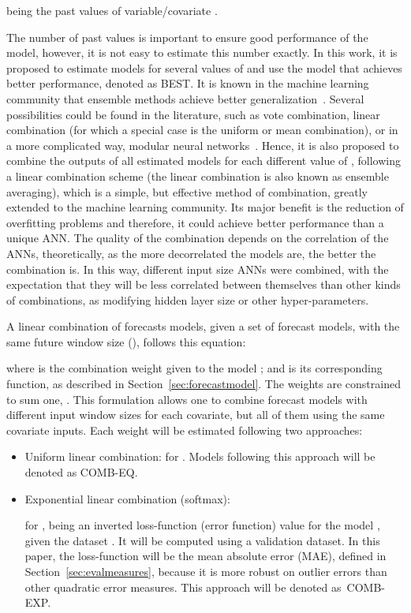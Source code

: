 \documentclass[energies,article,accept,moreauthors,pdftex,12pt,a4paper]{mdpi}
\newcommand{\ann}{ANN\xspace}
\newcommand{\anns}{ANNs\xspace}
\newcommand{\best}{BEST\xspace}
\newcommand{\comb}{COMB-EXP\xspace}
\newcommand{\combeq}{COMB-EQ\xspace}
\begin{document}
\vspace {-9pt}


 being the  past values of
variable/covariate .



The number of past values  is important to ensure good performance of the
model, however, it is not easy to estimate this number exactly. In this work, it
is proposed to estimate models for several values of  and use the model
that achieves better performance, denoted as \best. It is known in the machine learning community that ensemble methods achieve better
generalization~\cite{1991:neuralcomputing:jacobs,2006:icaisc:raudys,Yu20082623}.
Several possibilities could be found in the literature, such as vote combination,
linear combination (for which a special case is the uniform or mean combination),
or in a more complicated way, modular neural networks~\cite{1994:nn:Happel}.
Hence, it is also proposed to combine the outputs of all estimated models for each different
value of , following a linear combination scheme (the linear combination is also known as ensemble averaging),
which is a simple, but effective method of combination, greatly extended to the machine
learning community. Its major benefit is the reduction of overfitting problems
and therefore, it could achieve better performance than a unique \ann.
The quality of the combination depends on the correlation of the \anns,
theoretically, as the more decorrelated the models are, the better the
combination is. In this way, different input size
 \anns were combined, with the expectation that they will be less correlated between themselves than other kinds of combinations, as modifying hidden layer size or other hyper-parameters.

A linear combination of forecasts models, given a set  of  forecast models, \linebreak with the same future window size (), follows this equation:

\vspace {-6pt}


where  is the combination weight given to the model
; and  is its corresponding  function, as
described in Section~\ref{sec:forecastmodel}. The weights are constrained to sum
one, . This formulation allows one to combine forecast
models with different input window sizes for each covariate, but all of them
using the same covariate inputs. Each weight  will be estimated
following two approaches:

\begin{itemize}
\item Uniform linear combination:  for . Models following this approach will be denoted as \combeq. 


\vspace {-6pt}
\item Exponential linear combination (softmax):

 
for ,  being an inverted loss-function (error function) value for the
model , given the dataset . It will be computed using a
validation dataset. In this paper, the loss-function will be the mean absolute error
(MAE), defined in Section~\ref{sec:evalmeasures}, because it is more robust on
outlier errors than other quadratic error measures. This approach will be
denoted as~\comb.
\end{itemize}
\end{document}
